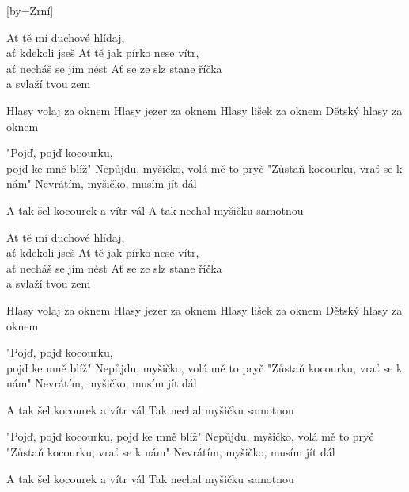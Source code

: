 [by={Zrní}]

\beginverse
Ať tě mí duchové hlídaj, \\
ať kdekoli jseš
Ať tě jak pírko nese vítr, \\
ať necháš se jím nést
Ať se ze slz stane říčka \\
a svlaží tvou zem
\endverse

\beginverse
Hlasy volaj za oknem
Hlasy jezer za oknem
Hlasy lišek za oknem
Dětský hlasy za oknem
\endverse

\beginverse
"Pojď, pojď kocourku, \\
pojď ke mně blíž"
Nepůjdu, myšičko, volá mě to pryč
"Zůstaň kocourku, vrať se k nám"
Nevrátím, myšičko, musím jít dál
\endverse

\beginverse
A tak šel kocourek a vítr vál
A tak nechal myšičku samotnou
\endverse

\beginverse
Ať tě mí duchové hlídaj, \\
ať kdekoli jseš
Ať tě jak pírko nese vítr, \\
ať necháš se jím nést
Ať se ze slz stane říčka \\
a svlaží tvou zem
\endverse

\beginverse
Hlasy volaj za oknem
Hlasy jezer za oknem
Hlasy lišek za oknem
Dětský hlasy za oknem
\endverse

\beginverse
"Pojď, pojď kocourku, \\
pojď ke mně blíž"
Nepůjdu, myšičko, volá mě to pryč
"Zůstaň kocourku, vrať se k nám"
Nevrátím, myšičko, musím jít dál
\endverse

\beginverse
A tak šel kocourek a vítr vál
Tak nechal myšičku samotnou
\endverse

\beginverse
"Pojď, pojď kocourku, pojď ke mně blíž"
Nepůjdu, myšičko, volá mě to pryč
"Zůstaň kocourku, vrať se k nám"
Nevrátím, myšičko, musím jít dál
\endverse

\beginverse
A tak šel kocourek a vítr vál
Tak nechal myšičku samotnou
\endverse
\endsong
